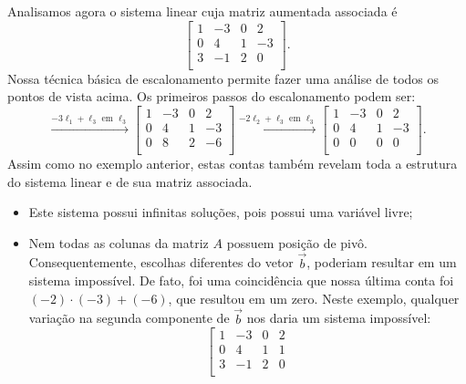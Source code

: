 \begin{ex}
	Analisamos agora o sistema linear cuja matriz aumentada associada é
	\begin{equation}
	\left[
	\begin{array}{ccc|c}
	1 & -3 & 0 & 2 \\
	0 &  4 & 1 & -3 \\
	3 & -1 & 2 & 0 \\
	\end{array}
	\right].
	\end{equation} Nossa técnica básica de escalonamento permite fazer uma análise de todos os pontos de vista acima. Os primeiros passos do escalonamento podem ser:
	\begin{equation}
	\xrightarrow{-3\ell_1 + \ell_3 \text{ em } \ell_3}
	\left[
	\begin{array}{ccc|c}
	1 & -3 & 0 & 2 \\
	0 &  4 & 1 & -3 \\
	0 &  8 & 2 & -6 \\
	\end{array}
	\right] \xrightarrow{-2\ell_2 + \ell_3 \text{ em } \ell_3}
	\left[
	\begin{array}{ccc|c}
	1 & -3 & 0 & 2 \\
	0 &  4 & 1 & -3 \\
	0 &  0 & 0 & 0 \\
	\end{array}
	\right].
	\end{equation} Assim como no exemplo anterior, estas contas também revelam toda a estrutura do sistema linear e de sua matriz associada.
	\begin{itemize}
		\item Este sistema possui infinitas soluções, pois possui uma variável livre;
		\item Nem todas as colunas da matriz $A$ possuem posição de pivô. Consequentemente, escolhas diferentes do vetor $\vec{b}$, poderiam resultar em um sistema impossível. De fato, foi uma coincidência que nossa última conta foi $(-2)\cdot (-3) + (-6)$, que resultou em um zero. Neste exemplo, qualquer variação na segunda componente de $\vec{b}$ nos daria um sistema impossível:
		\begin{equation}
		\left[
		\begin{array}{ccc|c}
		1 & -3 & 0 & 2 \\
		0 &  4 & 1 & 1 \\
		3 & -1 & 2 & 0 \\
		\end{array}

\end{equation}
\end{itemize}
\end{ex}
